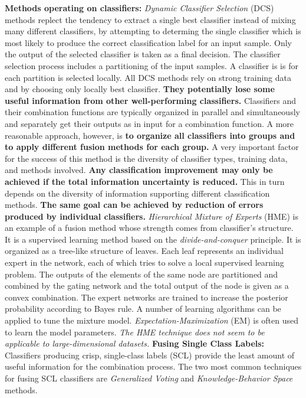 \documentclass[]{article}
\begin{document}
			\textbf{Methods operating on classifiers:}  \newline \textit{Dynamic Classifier Selection} (DCS) methods replect the tendency to extract  a single best classifier instead of mixing many different classifiers, by attempting to determing the single classifier which is most likely to produce the correct classification label for an input sample.  Only the output of the selected classifier is taken as a final decision.  The classifier selection process includes a partitioning of the input samples.  A classifier is is for each partition is selected locally.  All DCS methods rely on strong training data and by choosing only locally best classifier.  \textbf{They potentially lose some useful information from other well-performing classifiers.} Classifiers and their combination functions are typically organized in parallel and simultaneously and separately get their outputs as in input for a combination function.  A more reasonable approach, however, is \textbf{to organize all classifiers into groups and to apply different fusion methods for each group.}  A very important factor for the success of this method is the diversity of classifier types, training data, and methods involved.  \textbf{Any classification improvement may only be achieved if the total information uncertainty is reduced.}   This in turn depends on the diversity of information supporting different classification methods. \textbf{The same goal can be achieved by reduction of errors produced by individual classifiers.}  \textit{Hierarchical Mixture of Experts} (HME) is an example  of a fusion method whose strength comes from classifier's structure.  It is a supervised learning method based on the \textit{divide-and-conquer} principle.  It is organized as a tree-like structure of leaves.  Each leaf represents an individual expert in the network, each of which tries to solve a local supervised learning problem.  The outputs of the elements of the same node are partitioned and combined by the gating network and the total output of the node is given as a convex combination.  The expert networks are trained to increase the posterior probability according to Bayes rule.  A number  of learning algorithms can be applied to tune the mixture model.  \textit{Expectation-Maximization} (EM) is often used to learn the model parameters.  \textit{The HME technique does not seem to be applicable to large-dimensional datasets.} \newline \textbf{Fusing Single Class Labels:} Classifiers producing crisp, single-class labels (SCL) provide the least amount of useful information for the combination process.  The two most common techniques for fusing SCL classifiers are \textit{Generalized Voting} and \textit{Knowledge-Behavior Space} methods.  \\
\end{document}

